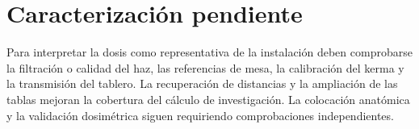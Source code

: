 \section{Caracterización pendiente}
Para interpretar la dosis como representativa de la instalación deben comprobarse la filtración o calidad del haz, las referencias de mesa, la calibración del kerma y la transmisión del tablero. La recuperación de distancias y la ampliación de las tablas mejoran la cobertura del cálculo de investigación. La colocación anatómica y la validación dosimétrica siguen requiriendo comprobaciones independientes.
\FloatBarrier
